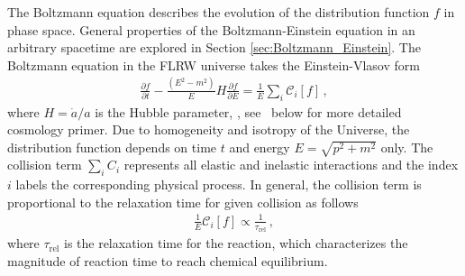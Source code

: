 The Boltzmann equation describes the evolution of the distribution function $f$ in phase space. General properties of the Boltzmann-Einstein equation in an arbitrary spacetime are explored in Section \ref{sec:Boltzmann_Einstein}. The Boltzmann equation in the FLRW universe takes the Einstein-Vlasov form
\begin{align}\label{Hubble:Boltzmann}
\frac{\partial f}{\partial t}-\frac{\left(E^2-m^2\right)}{E}H\frac{\partial f}{\partial E}=\frac{1}{E}\sum_{i}\mathcal{C}_i[f]\,,
\end{align}
where $H=\dot{a}/a$ is the Hubble parameter, , see~ below for more detailed cosmology primer. Due to homogeneity and isotropy of the Universe, the distribution function depends on time $t$ and energy $E=\sqrt{p^2+m^2}$ only. The collision term $\sum_i C_i$ represents all elastic and inelastic interactions and the index $i$ labels the corresponding physical process. In general, the collision term is proportional to the relaxation time for given collision as follows~\cite{Anderson:1974nyl}
\begin{align}
\frac{1}{E}\mathcal{C}_i[f]\propto\frac{1}{\tau_\mathrm{rel}}\,,
\end{align}
where $\tau_\mathrm{rel}$ is the relaxation time for the reaction, which characterizes the magnitude  of reaction time to reach chemical equilibrium. 

